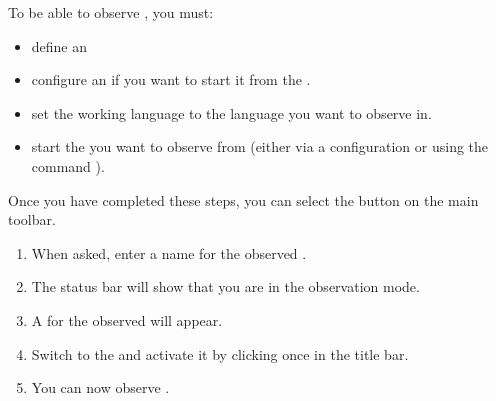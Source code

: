 
\label{startobs}
To be able to observe \gdsteps{}, you must:
\begin{itemize}
\item define an \gdaut{} 
\item configure an \gdaut{}  if you want to start it from the \ite{}. 
\item set the working language to the language you want to observe in.
\item start the \gdaut{} you want to observe from  (either via a configuration  or using the  command ). 
\end{itemize}

Once you have completed these steps, you can select the  button 
on the main toolbar.
\begin{enumerate}
 \item When asked, enter a name for the observed \gdcase{}.
 \item The status bar will show that you are in the observation mode. 
 \item A \gdtestcaseeditor{} for the observed \gdcase{} will appear. 
 \item Switch to the \gdaut and activate it by clicking once in the title bar.
 \item You can now observe \gdsteps{}.
\end{enumerate}


 


 

